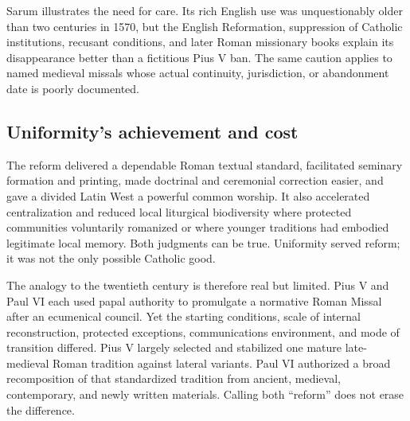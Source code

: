 Sarum illustrates the need for care. Its rich English use was unquestionably older than two centuries in 1570, but the English Reformation, suppression of Catholic institutions, recusant conditions, and later Roman missionary books explain its disappearance better than a fictitious Pius V ban. The same caution applies to named medieval missals whose actual continuity, jurisdiction, or abandonment date is poorly documented.

\subsection{Uniformity's achievement and cost}

The reform delivered a dependable Roman textual standard, facilitated seminary formation and printing, made doctrinal and ceremonial correction easier, and gave a divided Latin West a powerful common worship. It also accelerated centralization and reduced local liturgical biodiversity where protected communities voluntarily romanized or where younger traditions had embodied legitimate local memory. Both judgments can be true. Uniformity served reform; it was not the only possible Catholic good.

The analogy to the twentieth century is therefore real but limited. Pius V and Paul VI each used papal authority to promulgate a normative Roman Missal after an ecumenical council. Yet the starting conditions, scale of internal reconstruction, protected exceptions, communications environment, and mode of transition differed. Pius V largely selected and stabilized one mature late-medieval Roman tradition against lateral variants. Paul VI authorized a broad recomposition of that standardized tradition from ancient, medieval, contemporary, and newly written materials. Calling both “reform” does not erase the difference.


